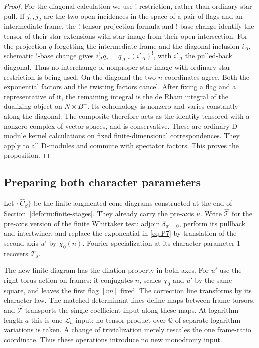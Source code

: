 \begin{proof}
For the diagonal calculation we use $!$-restriction, rather than
ordinary star pull.  If $j_1,j_2$ are the two open incidences in the
space of a pair of flags and an intermediate frame, the $!$-tensor
projection formula and $!$-base change identify the tensor of their
star extensions with star image from their open intersection.
For the projection $q$ forgetting the intermediate frame and the
diagonal inclusion $i_\Delta$, schematic $!$-base change gives
$i_\Delta^!q_*=q_{\Delta,*}(i'_\Delta)^!$, with $i'_\Delta$ the pulled-back
diagonal.  Thus no interchange of nonproper star image with ordinary
star restriction is being used.
On the diagonal the two $n$-coordinates agree.  Both the exponential
factors and the twisting factors cancel.  After fixing a flag and a
representative of it, the remaining integral is the de Rham integral of
the dualizing object on $N\times B^-$.  Its cohomology is nonzero and
varies constantly along the diagonal.  The composite therefore acts as
the identity tensored with a nonzero complex of vector spaces, and is
conservative.  These are ordinary D-module kernel calculations on fixed
finite-dimensional correspondences.  They apply to all D-modules and
commute with spectator factors.  This proves the proposition.
\end{proof}

\subsection{Preparing both character parameters}
\label{planch:two-axes}

Let $\{\widehat C_\beta\}$ be the finite augmented cone diagrams
constructed at the end of Section~\ref{deform:finite-stages}.  They
already carry the pre-axis $u$.  Write $\widehat{\mathcal T}$ for the
pre-axis version of the finite Whittaker test: adjoin
$\delta_{u'=0}$, perform its pullback and intertwiner, and replace the
exponential in \eqref{eq:P7} by translation of the second axis $u'$ by
$\chi_0(n)$.  Fourier specialization at its character parameter $1$
recovers $\mathcal T_s$.

The new finite diagram has the dilation property in both axes.  For
$u'$ use the right torus action on frames: it conjugates $n$, scales
$\chi_0$ and $u'$ by the same square, and leaves the first flag $[vn]$
fixed.  The correction line transforms by its character law.  The
matched determinant lines define maps between frame torsors, and
$\widehat{\mathcal T}$ transports the single coefficient input along
these maps.  At logarithm length $a$ this is one $\mathcal L_a$ input;
no tensor product over $\mathbb Q$ of separate logarithm variations is
taken.  A change of trivialization merely rescales the one frame-ratio
coordinate.  Thus these operations introduce no new monodromy input.

